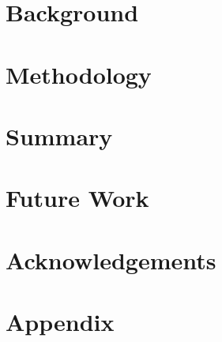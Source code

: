 \documentclass{article}
\begin{document}
\section{Background}


\section{Methodology}


\section{Summary}
\section{Future Work}
\section{Acknowledgements}
\section{Appendix}





\end{document}
